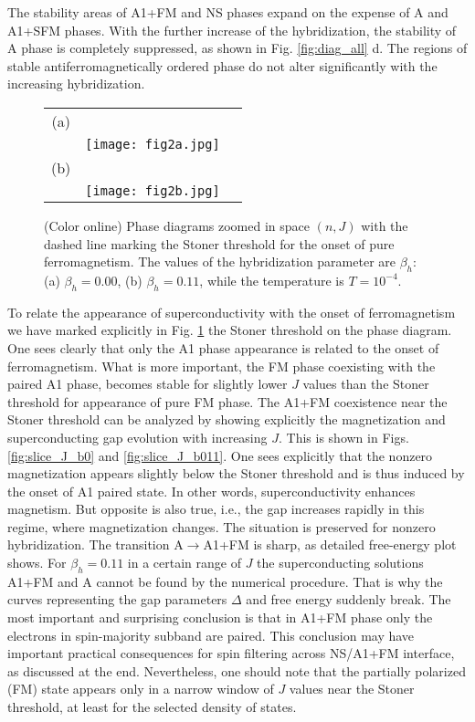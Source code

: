 \documentclass[aps,prb,showpacs,reprint]{revtex4-1}
\begin{document}
The stability areas of A1+FM and NS phases
expand on the expense of A and A1+SFM phases. With the further
increase of the hybridization, the
stability of A phase is completely suppressed, as shown in Fig.
\ref{fig:diag_all} d. The regions
of stable antiferromagnetically ordered phase do
not alter significantly with the increasing hybridization. 
\begin{figure}[htbp]
\centering
\begin{tabular}{ccc}
  (a) & & \quad \quad \quad \quad \quad\\
      & \texttt{[image: fig2a.jpg]} & \\
  (b) & & \quad \quad \quad \quad \quad\\
      & \texttt{[image: fig2b.jpg]} &\\
\end{tabular}
\caption{(Color online) Phase diagrams zoomed in space $(n,J)$ with the dashed
line marking the Stoner threshold for the onset of pure ferromagnetism. The values of the hybridization parameter are $\beta_h$: (a)
$\beta_h=0.00$, (b) $\beta_h=0.11$, while the temperature is $T=10^{-4}$.}
\label{fig:diag_stoner}
\end{figure}
To relate the appearance of superconductivity with the onset of ferromagnetism we
have marked explicitly in Fig. \ref{fig:diag_stoner} the Stoner threshold on the phase diagram. One sees clearly that only the A1 phase appearance
is related to the onset of ferromagnetism. What is more important, the FM phase coexisting
with the paired A1 phase, becomes stable for slightly lower $J$ values than the Stoner threshold for appearance of pure FM phase. The A1+FM coexistence near the Stoner threshold can be analyzed by showing
explicitly the magnetization and superconducting gap evolution with increasing
$J$. This is shown in Figs. \ref{fig:slice_J_b0} and \ref{fig:slice_J_b011}. One sees explicitly that the
nonzero magnetization appears slightly below the Stoner threshold and is thus
induced by the onset of A1 paired state. In other words, superconductivity
enhances magnetism. But opposite is also true, i.e., the gap increases rapidly
in this regime, where magnetization changes. The situation is preserved for
nonzero hybridization. The transition A$\rightarrow$A1+FM is sharp, as
detailed free-energy plot shows. For $\beta_h=0.11$ in a certain range of $J$
the superconducting solutions A1+FM and A cannot be found by the numerical
procedure. That is why the curves representing the gap parameters $\Delta$ and
free energy suddenly break. The most important and surprising conclusion is
that in A1+FM phase only the electrons in spin-majority subband are paired. This
conclusion may have important practical consequences for spin filtering across
NS/A1+FM interface, as discussed at the end. Nevertheless, one should note that
the partially polarized (FM) state appears only in a narrow window of $J$ values
near the Stoner threshold, at least for the selected density of states.
\end{document}
